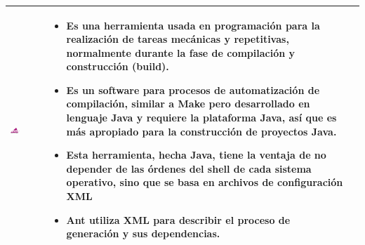 \begin{table}[b!]
\begin{tabular}{|p{2cm}|ll}
        \hline
          \multicolumn{1}{|p{5cm}|}{\includegraphics[width=0.3\textwidth]{images/ant}} & 
          \multicolumn{1}{p{10cm}|}{
          \begin{itemize}
          \vspace{-27mm}
          \item Es una herramienta usada en programación para la realización de tareas mecánicas y repetitivas, normalmente durante la fase de compilación y construcción (build). 
        \item Es un software para procesos de automatización de compilación, similar a Make pero desarrollado en lenguaje Java y requiere la plataforma Java, así que es más apropiado para la construcción de proyectos Java.
        \item Esta herramienta, hecha Java, tiene la ventaja de no depender de las órdenes del shell de cada sistema operativo, sino que se basa en archivos de configuración XML 
        \item  Ant utiliza XML para describir el proceso de generación y sus dependencias.
      
      \end{itemize}} \\ 
       \hline
        
      \end{tabular}
     
      \label{Cuadro Comparativo}
    \end{table}
